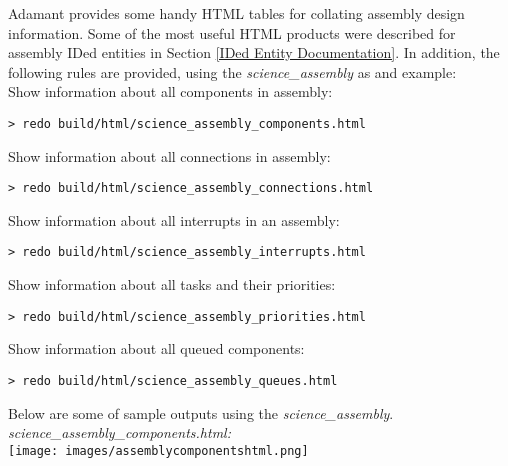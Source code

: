 Adamant provides some handy HTML tables for collating assembly design information. Some of the most useful HTML products were described for assembly IDed entities in Section \ref{IDed Entity Documentation}. In addition, the following rules are provided, using the \textit{science\_assembly} as and example: \\

Show information about all components in assembly: \\
\begin{verbatim}
> redo build/html/science_assembly_components.html
\end{verbatim}
\vspace{7mm} %

Show information about all connections in assembly: \\
\begin{verbatim}
> redo build/html/science_assembly_connections.html
\end{verbatim}
\vspace{7mm} %

Show information about all interrupts in an assembly: \\
\begin{verbatim}
> redo build/html/science_assembly_interrupts.html
\end{verbatim}
\vspace{7mm} %

Show information about all tasks and their priorities: \\
\begin{verbatim}
> redo build/html/science_assembly_priorities.html
\end{verbatim}
\vspace{7mm} %

Show information about all queued components: \\
\begin{verbatim}
> redo build/html/science_assembly_queues.html
\end{verbatim}
\vspace{7mm} %

Below are some of sample outputs using the \textit{science\_assembly}. \\

\textit{science\_assembly\_components.html:} \\

\texttt{[image: images/assemblycomponentshtml.png]}
\vspace{7mm} %

